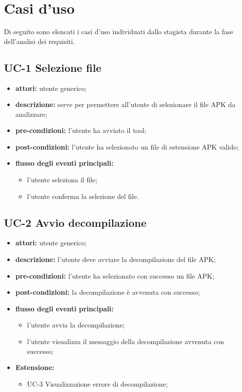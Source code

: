 \section{Casi d'uso}\label{sec:casi-d'uso}
Di seguito sono elencati i casi d'uso individuati dallo stagista durante la fase dell'analisi dei requisiti.
\subsection*{UC-1 Selezione file}\label{subsec:uc-1-selezione-file}
\begin{itemize}
    \item \textbf{attori:} utente generico;
    \item \textbf{descrizione:} serve per permettere all'utente di selezionare il file APK da analizzare;
    \item \textbf{pre-condizioni:} l'utente ha avviato il tool;
    \item \textbf{post-condizioni:} l'utente ha selezionato un file di estensione APK valido;
    \item \textbf{flusso degli eventi principali:}
    \begin{itemize}
        \item l'utente seleziona il file;
        \item l'utente conferma la selezione del file.
    \end{itemize}
\end{itemize}
\subsection*{UC-2 Avvio decompilazione}\label{subsec:uc-2-avvio-decompilazione}
\begin{itemize}
    \item \textbf{attori:} utente generico;
    \item \textbf{descrizione:} l'utente deve avviare la decompilazione del file APK;
    \item \textbf{pre-condizioni:} l'utente ha selezionato con successo un file APK;
    \item \textbf{post-condizioni:} la decompilazione è avvenuta con successo;
    \item \textbf{flusso degli eventi principali:}
    \begin{itemize}
        \item l'utente avvia la decompilazione;
        \item l'utente visualizza il messaggio della decompilazione avvenuta con successo;
    \end{itemize}
    \item \textbf{Estensione:}
    \begin{itemize}
        \item UC-3 Visualizzazione errore di decompilazione;
    \end{itemize}
\end{itemize}

